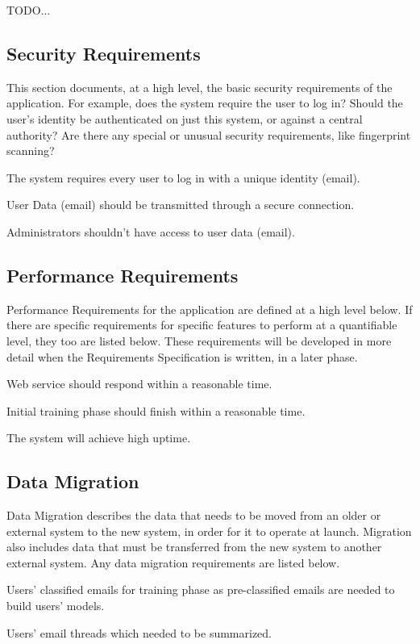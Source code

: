 \documentclass[a4paper,10pt]{article}
\newenvironment{my_enumerate}
{\begin{enumerate}
  \setlength{\itemsep}{0cm}
  \setlength{\parskip}{0cm}}
{\end{enumerate}}
\begin{document}
TODO...
\subsection{Security Requirements}
This section documents, at a high level, the basic security requirements of the 
application. For example, does the system require the user to log in?  Should the 
user’s identity be authenticated on just this system, or against a central authority?  
Are there any special or unusual security requirements, like fingerprint scanning?

\begin{my_enumerate}
  \item The system requires every user to log in with a unique identity (email).
  \item User Data (email) should be transmitted through a secure connection.
  \item Administrators shouldn’t have access to user data (email).
\end{my_enumerate}



\subsection{Performance Requirements}
Performance Requirements for the application are defined at a high level below. 
If there are specific requirements for specific features to perform at a quantifiable 
level, they too are listed below. These requirements will be developed in more detail when 
the Requirements Specification is written, in a later phase.

\begin{my_enumerate}
  \item Web service should respond within a reasonable time.
  \item Initial training phase should finish within a reasonable time.
  \item The system will achieve high uptime.
\end{my_enumerate}


\subsection{Data Migration}
Data Migration describes the data that needs to be moved from an older or external 
system to the new system, in order for it to operate at launch. Migration also includes 
data that must be transferred from the new system to another external system. 
Any data migration requirements are listed below.

\begin{my_enumerate}
  \item Users' classified emails for training phase as pre-classified emails are needed to build users' models.
  \item Users' email threads which needed to be summarized.
\end{my_enumerate}
\end{document}
